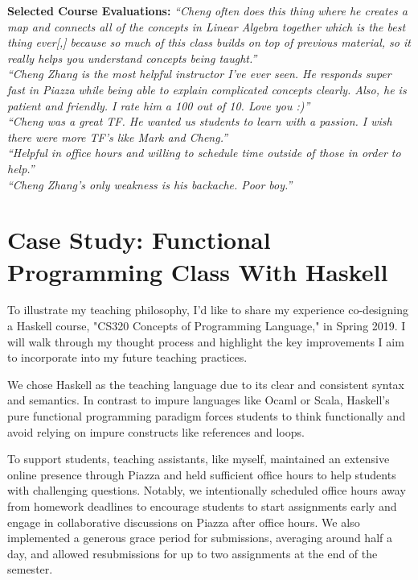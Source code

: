 \documentclass[11pt,a4paper,sans]{moderncv} %
\begin{document}
\textbf{Selected Course Evaluations:}
\emph{``Cheng often does this thing where he creates a map and connects all of the concepts in Linear Algebra together which is the best thing ever[,] because so much of this class builds on top of previous material, so it really helps you understand concepts being taught.''}\\[3px]
\emph{``Cheng Zhang is the most helpful instructor I've ever seen. He responds super fast in Piazza while being able to explain complicated concepts clearly. Also, he is patient and friendly. I rate him a 100 out of 10. Love you :)''}\\[3px]
\emph{``Cheng was a great TF. He wanted us students to learn with a passion. I wish there were more TF's like Mark and Cheng.''}\\[3px]
\emph{``Helpful in office hours and willing to schedule time outside of those in order to help.''}\\[3px]
\emph{``Cheng Zhang's only weakness is his backache. Poor boy.''}


\section{Case Study: Functional Programming Class With Haskell}

To illustrate my teaching philosophy, I'd like to share my experience co-designing a Haskell course, "CS320 Concepts of Programming Language," in Spring 2019.
I will walk through my thought process and highlight the key improvements I aim to incorporate into my future teaching practices.

We chose Haskell as the teaching language due to its clear and consistent syntax and semantics. 
In contrast to impure languages like Ocaml or Scala, Haskell's pure functional programming paradigm forces students to think functionally and avoid relying on impure constructs like references and loops.

To support students, teaching assistants, like myself, maintained an extensive online presence through Piazza and held sufficient office hours to help students with challenging questions. 
Notably, we intentionally scheduled office hours away from homework deadlines to encourage students to start assignments early and engage in collaborative discussions on Piazza after office hours.
We also implemented a generous grace period for submissions, averaging around half a day, and allowed resubmissions for up to two assignments at the end of the semester. 
\end{document}
